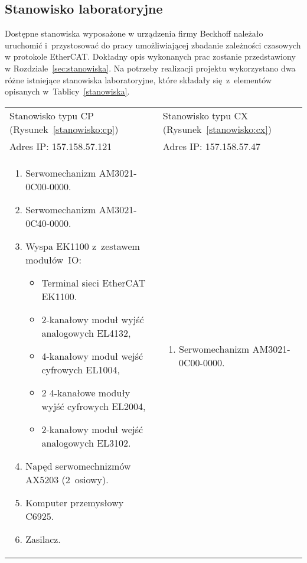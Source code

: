 \subsection{Stanowisko laboratoryjne}
Dostępne stanowiska wyposażone w urządzenia firmy Beckhoff należało uruchomić i~przystosować do pracy umożliwiającej zbadanie zależności czasowych w protokole EtherCAT. Dokładny opis wykonanych prac zostanie przedstawiony w Rozdziale~\ref{sec:stanowiska}.
Na potrzeby realizacji projektu wykorzystano dwa różne istniejące stanowiska laboratoryjne, które składały się~z~elementów opisanych w~Tablicy~\ref{stanowiska}.
\begin{table}[!htb]
\begin{center}
\begin{tabular}{| p{} | p{} |}\hline
Stanowisko typu CP (Rysunek~\ref{stanowisko:cp}) & Stanowisko typu CX (Rysunek~\ref{stanowisko:cx})  \\
Adres IP: 157.158.57.121 & Adres IP: 157.158.57.47  \\\hline
\begin{enumerate}[leftmargin=7mm]
\setlength{\itemsep}{5pt}
\setlength{\parskip}{0pt}
\setlength{\parsep}{0pt}
\item Serwomechanizm AM3021-0C00-0000.
\item Serwomechanizm AM3021-0C40-0000.
\item Wyspa EK1100 z~zestawem modułów~IO:
\begin{itemize}[leftmargin=3mm]
\setlength{\itemsep}{3pt}
\setlength{\parskip}{0pt}
\setlength{\parsep}{0pt}
\item Terminal sieci EtherCAT EK1100.
\item 2-kanałowy moduł wyjść analogowych EL4132,
\item 4-kanałowy moduł wejść cyfrowych EL1004,
\item 2 4-kanałowe moduły wyjść cyfrowych EL2004,
\item 2-kanałowy moduł wejść analogowych EL3102.
\end{itemize}
\item Napęd serwomechnizmów AX5203 (2~osiowy).
\item Komputer przemysłowy C6925.
\item Zasilacz.
\end{enumerate}
&
\begin{enumerate}[leftmargin=7mm]
\setlength{\itemsep}{5pt}
\setlength{\parskip}{0pt}
\setlength{\parsep}{0pt}
\item Serwomechanizm AM3021-0C00-0000.

\end{enumerate}
\end{tabular}
\end{center}
\end{table}
